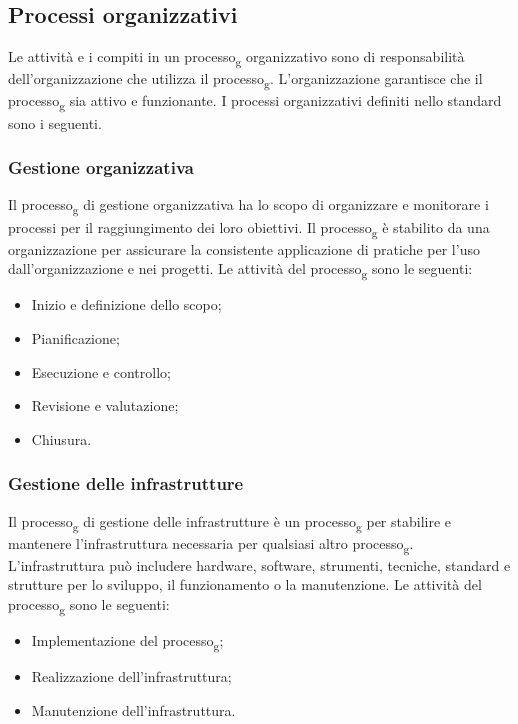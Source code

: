 \subsection{Processi organizzativi}
Le attività e i compiti in un processo\textsubscript{g} organizzativo sono di responsabilità dell'organizzazione che utilizza il processo\textsubscript{g}. L'organizzazione garantisce che il processo\textsubscript{g} sia attivo e funzionante.
I processi organizzativi definiti nello standard sono i seguenti.

\subsubsection{Gestione organizzativa}
Il processo\textsubscript{g} di gestione organizzativa ha lo scopo di organizzare e monitorare i processi per il raggiungimento dei loro obiettivi. Il processo\textsubscript{g} è stabilito da una organizzazione per assicurare la consistente applicazione di pratiche per l'uso dall'organizzazione e nei progetti.
Le attività del processo\textsubscript{g} sono le seguenti:
\begin{itemize}
\item Inizio e definizione dello scopo;
\item Pianificazione;
\item Esecuzione e controllo;
\item Revisione e valutazione;
\item Chiusura.
\end{itemize}
\subsubsection{Gestione delle infrastrutture}
Il processo\textsubscript{g} di gestione delle infrastrutture è un processo\textsubscript{g} per stabilire e mantenere l'infrastruttura necessaria per qualsiasi altro processo\textsubscript{g}. L'infrastruttura può includere hardware, software, strumenti, tecniche, standard e strutture per lo sviluppo, il funzionamento o la manutenzione.
Le attività del processo\textsubscript{g} sono le seguenti:
\begin{itemize}
\item Implementazione del processo\textsubscript{g};
\item Realizzazione dell'infrastruttura;
\item Manutenzione dell'infrastruttura.
\end{itemize}

